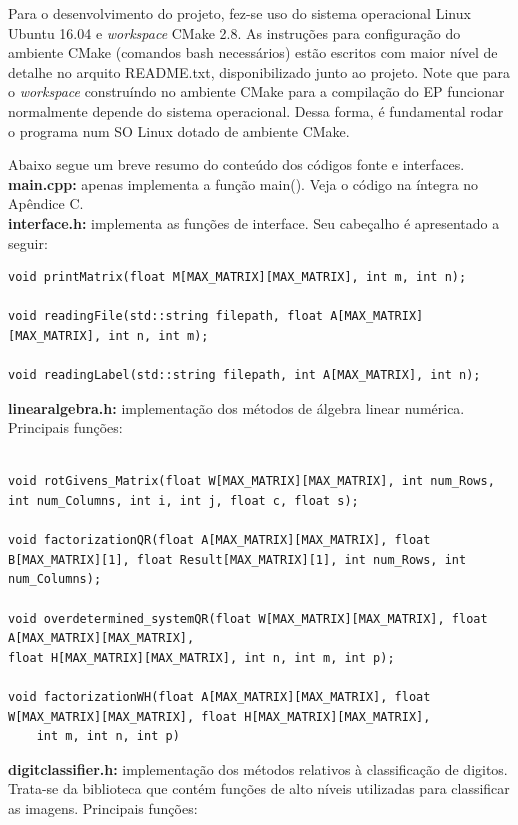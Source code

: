 \documentclass[twocolumn,amsmath,amssymb,floatfix]{revtex4}
\begin{document}
Para o desenvolvimento do projeto, fez-se uso do sistema operacional Linux Ubuntu 16.04 e \textit{workspace} CMake 2.8. As instruções para configuração do ambiente CMake (comandos bash necessários) estão escritos com maior nível de detalhe no arquito README.txt, disponibilizado junto ao projeto. Note que para o \textit{workspace} construíndo no ambiente CMake para a compilação do EP funcionar normalmente depende do sistema operacional. Dessa forma, é fundamental rodar o programa num SO Linux dotado de ambiente CMake. 

Abaixo segue um breve resumo do conte\'udo dos c\'odigos fonte e interfaces.
\\\indent \textbf{main.cpp:} apenas implementa a função main(). Veja o c\'odigo na íntegra no Ap\^endice C.
\\\indent \textbf{interface.h:} implementa as funções de interface. Seu cabeçalho é apresentado a seguir:
\begin{lstlisting}
void printMatrix(float M[MAX_MATRIX][MAX_MATRIX], int m, int n);

void readingFile(std::string filepath, float A[MAX_MATRIX][MAX_MATRIX], int n, int m);

void readingLabel(std::string filepath, int A[MAX_MATRIX], int n);

\end{lstlisting}
\indent \textbf{linearalgebra.h:} implementação dos métodos de álgebra linear numérica. Principais funções:

\begin{lstlisting}

void rotGivens_Matrix(float W[MAX_MATRIX][MAX_MATRIX], int num_Rows, int num_Columns, int i, int j, float c, float s);

void factorizationQR(float A[MAX_MATRIX][MAX_MATRIX], float B[MAX_MATRIX][1], float Result[MAX_MATRIX][1], int num_Rows, int num_Columns);

void overdetermined_systemQR(float W[MAX_MATRIX][MAX_MATRIX], float A[MAX_MATRIX][MAX_MATRIX],
float H[MAX_MATRIX][MAX_MATRIX], int n, int m, int p);

void factorizationWH(float A[MAX_MATRIX][MAX_MATRIX], float W[MAX_MATRIX][MAX_MATRIX], float H[MAX_MATRIX][MAX_MATRIX],
	int m, int n, int p)

\end{lstlisting}

\indent \textbf{digitclassifier.h:} implementação dos métodos relativos à classificação de digitos. Trata-se da biblioteca que contém funções de alto níveis utilizadas para classificar as imagens. Principais funções:
\end{document}
